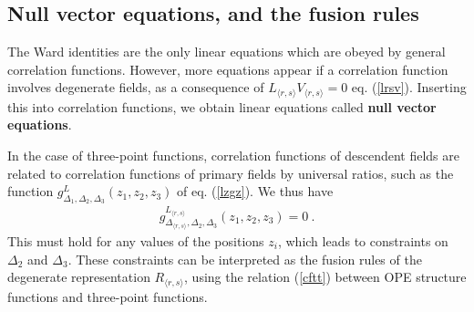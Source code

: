 \documentclass[12pt,a4paper,notitlepage]{report}
\numberwithin{equation}{section}
\theoremstyle{break}
\begin{document}
\subsection{Null vector equations, and the fusion rules}

The Ward identities are the only linear equations which are obeyed by general correlation functions. However, more equations appear if a correlation function involves degenerate fields, as a consequence of $L_{\langle r,s \rangle} V_{\langle r,s \rangle} = 0$ eq. (\ref{lrsv}). Inserting this into correlation functions, we obtain linear equations called \textbf{\boldmath null vector equations}. 

In the case of three-point functions, correlation functions of descendent fields are related to correlation functions of primary fields by universal ratios, such as the function $g^{L}_{\Delta_1,\Delta_2,\Delta_3}(z_1,z_2,z_3)$ of eq. (\ref{lzgz}). We thus have 
\begin{align}
 g^{L_{\langle r,s \rangle}}_{\Delta_{\langle r,s \rangle},\Delta_2,\Delta_3}(z_1,z_2,z_3) = 0 \ .
\end{align}
This must hold for any values of the positions $z_i$, which leads to constraints on $\Delta_2$ and $\Delta_3$. These constraints can be interpreted as the fusion rules of the degenerate representation $R_{\langle r,s \rangle}$, using the relation (\ref{cftt}) between OPE structure functions and three-point functions.
\end{document}
